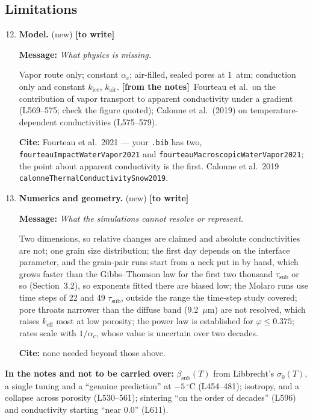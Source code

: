 \documentclass[11pt]{article}
\newcommand{\Miss}{\textcolor{miss}{\textbf{[to write]}}\ }
\newcommand{\Note}{\textcolor{open}{\textbf{[from the notes]}}\ }
\newcommand{\Cite}[1]{\par{\footnotesize\raggedright\textcolor{have}{\textbf{Cite:}} #1\par}}
\newcommand{\Msg}[1]{\par\textcolor{open}{\textbf{Message:}} \textit{#1}\par}
\newcommand{\New}[1]{\textbf{#1} \textnormal{\small(new)}}
\begin{document}
\subsection{Limitations}
\begin{enumerate}
\setcounter{enumi}{11}
\item \New{Model.} \Miss
  \Msg{What physics is missing.}
  Vapor route only; constant $\alpha_c$; air-filled,
  sealed pores at 1~atm; conduction only and constant $k_{\mathrm{ice}}$,
  $k_{\mathrm{air}}$. \Note Fourteau et al.\ on the contribution of vapor
  transport to apparent conductivity under a gradient (L569--575; check the
  figure quoted); Calonne et al.\ (2019) on temperature-dependent
  conductivities (L575--579).
  \Cite{Fourteau et al.\ 2021 --- your \texttt{.bib} has two, \texttt{fourteauImpactWaterVapor2021} and \texttt{fourteauMacroscopicWaterVapor2021}; the point about apparent conductivity is the first. Calonne et al.\ 2019 \texttt{calonneThermalConductivitySnow2019}.}
\item \New{Numerics and geometry.} \Miss
  \Msg{What the simulations cannot resolve or represent.}
  Two dimensions, so relative
  changes are claimed and absolute conductivities are not; one grain size
  distribution; the first day depends on the interface parameter, and the
  grain-pair runs start from a neck put in by hand, which grows faster than
  the Gibbs--Thomson law for the first two thousand
  $\tau_{\mathrm{sub}}$ or so (Section~3.2), so exponents fitted there are
  biased low; the Molaro runs use time steps of 22 and 49
  $\tau_{\mathrm{sub}}$, outside the range the time-step study covered; pore
  throats narrower than the diffuse band (9.2~$\mu$m) are not resolved,
  which raises $k_{\mathrm{eff}}$ most at low porosity; the power law is
  established for $\varphi \le 0.375$; rates scale with $1/\alpha_c$, whose
  value is uncertain over two decades.
  \Cite{none needed beyond those above.}
\end{enumerate}

\textbf{In the notes and not to be carried over:} $\beta_{\mathrm{sub}}(T)$
from Libbrecht's $\sigma_0(T)$, a single tuning and a ``genuine prediction''
at $-5\,^{\circ}$C (L454--481); isotropy, and a collapse across porosity
(L530--561); sintering ``on the order of decades'' (L596) and conductivity
starting ``near 0.0'' (L611).
\end{document}
